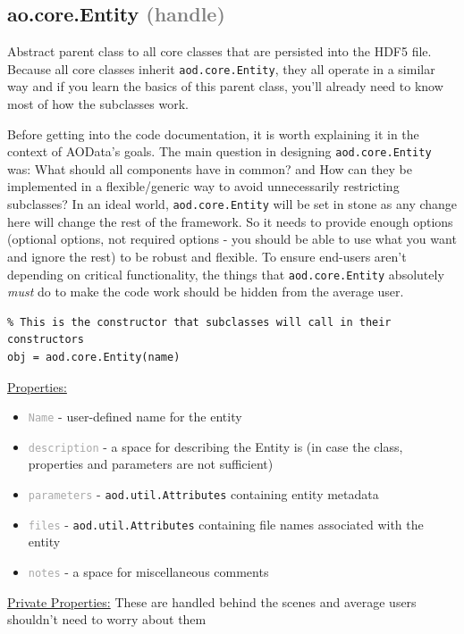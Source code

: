 \documentclass[10pt]{exam}
\newcommand\aodclass[1]{\textcolor{codeblue}{\texttt{#1}}}
\newcommand\aodprop[1]{\textcolor{darkgray}{\texttt{#1}}}
\newcommand\docheader[1]{\vspace{0.6ex}\noindent\underline{#1}\vspace{0.15ex}}
\begin{document}
	\subsection{ao.core.Entity \textcolor{gray}{(handle)}}
		\label{subsection:EntityDoc}
		\noindent  Abstract parent class to all core classes that are persisted into the HDF5 file. Because all core classes inherit \aodclass{aod.core.Entity}, they all operate in a similar way and if you learn the basics of this parent class, you'll already need to know most of how the subclasses work.
		
		Before getting into the code documentation, it is worth explaining it in the context of AOData's goals. The main question in designing \aodclass{aod.core.Entity} was: What should all components have in common? and How can they be implemented in a flexible/generic way to avoid unnecessarily restricting subclasses? In an ideal world, \aodclass{aod.core.Entity} will be set in stone as any change here will change the rest of the framework. So it needs to provide enough options (optional options, not required options - you should be able to use what you want and ignore the rest) to be robust and flexible. To ensure end-users aren't depending on critical functionality, the things that \aodclass{aod.core.Entity} absolutely \textit{must} do to make the code work should be hidden from the average user.  
		\begin{lstlisting}[style=matlab-editor, basicstyle=\mlttfamily\footnotesize]
% Note that aod.core.Entity is abstract and never directly instantiated.
% This is the constructor that subclasses will call in their constructors
obj = aod.core.Entity(name)
		\end{lstlisting}
		\docheader{Properties:} 
		\begin{itemize}
			\item \aodprop{Name} - user-defined name for the entity
			\item \aodprop{description} - a space for describing the Entity is (in case the class, properties and parameters are not sufficient)
			\item \aodprop{parameters} - \aodclass{aod.util.Attributes} containing entity metadata
			\item \aodprop{files} - \aodclass{aod.util.Attributes} containing file names associated with the entity
			\item \aodprop{notes} - a space for miscellaneous comments
		\end{itemize}
		\docheader{Private Properties:} These are handled behind the scenes and average users shouldn't need to worry about them
\end{document}
